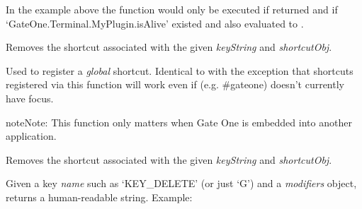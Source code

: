 \documentclass[letterpaper,10pt,openany]{sphinxmanual}
\begin{document}
\begin{fulllineitems}
\begin{fulllineitems}
In the example above the  function would only be executed if  returned  and if `GateOne.Terminal.MyPlugin.isAlive' existed and also evaluated to .

\end{fulllineitems}



\begin{fulllineitems}
\label{Developer/js_gateone:GateOne.Input.unregisterShortcut}
Removes the shortcut associated with the given \emph{keyString} and \emph{shortcutObj}.

\end{fulllineitems}



\begin{fulllineitems}
\label{Developer/js_gateone:GateOne.Input.registerGlobalShortcut}
Used to register a \emph{global} shortcut.  Identical to {\hyperref[Developer/js_gateone:GateOne.Input.registerShortcut]{}} with the exception that shortcuts registered via this function will work even if  (e.g. \#gateone) doesn't currently have focus.

\begin{notice}{note}{Note:}
This function only matters when Gate One is embedded into another application.
\end{notice}

\end{fulllineitems}



\begin{fulllineitems}
\label{Developer/js_gateone:GateOne.Input.unregisterGlobalShortcut}
Removes the shortcut associated with the given \emph{keyString} and \emph{shortcutObj}.

\end{fulllineitems}



\begin{fulllineitems}
\label{Developer/js_gateone:GateOne.Input.humanReadableShortcut}
Given a key \emph{name} such as `KEY\_DELETE' (or just `G') and a \emph{modifiers} object, returns a human-readable string.  Example:


\end{fulllineitems}
\end{fulllineitems}
\end{document}
